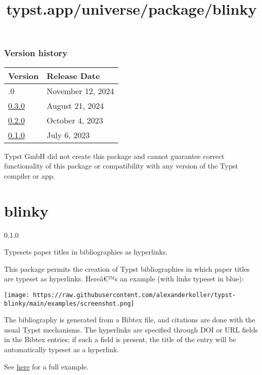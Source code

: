 \label{versions}
\subsubsection{Version history}\label{version-history}

\begin{longtable}[]{@{}ll@{}}
\toprule\noalign{}
Version & Release Date \\
\midrule\noalign{}
\endhead
\bottomrule\noalign{}
\endlastfoot
0.4.0 & November 12, 2024 \\
\href{https://typst.app/universe/package/leipzig-glossing/0.3.0/}{0.3.0}
& August 21, 2024 \\
\href{https://typst.app/universe/package/leipzig-glossing/0.2.0/}{0.2.0}
& October 4, 2023 \\
\href{https://typst.app/universe/package/leipzig-glossing/0.1.0/}{0.1.0}
& July 6, 2023 \\
\end{longtable}

Typst GmbH did not create this package and cannot guarantee correct
functionality of this package or compatibility with any version of the
Typst compiler or app.


\title{typst.app/universe/package/blinky}

\label{banner}
\section{blinky}\label{blinky}

{ 0.1.0 }

Typesets paper titles in bibliographies as hyperlinks.

\label{readme}
This package permits the creation of Typst bibliographies in which paper
titles are typeset as hyperlinks. Hereâ€™s an example (with links
typeset in blue):

\texttt{[image: https://raw.githubusercontent.com/alexanderkoller/typst-blinky/main/examples/screenshot.png]}

The bibliography is generated from a Bibtex file, and citations are done
with the usual Typst mechanisms. The hyperlinks are specified through
DOI or URL fields in the Bibtex entries; if such a field is present, the
title of the entry will be automatically typeset as a hyperlink.

See
\href{https://github.com/alexanderkoller/typst-blinky/tree/main/examples}{here}
for a full example.


